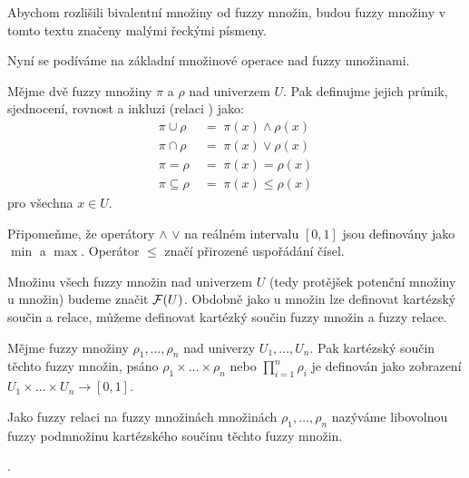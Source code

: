 \documentclass[a4paper,10pt]{article}
\begin{document}
\begin{notation*}
 Abychom rozlišili  bivalentní množiny od fuzzy množin, budou fuzzy množiny v tomto textu značeny malými řeckými písmeny.
\end{notation*}

Nyní se podíváme na základní množinové operace nad fuzzy množinami.
\begin{definition}
 Mějme dvě fuzzy množiny $\pi$ a $\rho$ nad univerzem $U$. Pak definujme jejich průnik, sjednocení, rovnost a inkluzi (relaci ) jako:
 \begin{align*}
  \pi \cup \rho 	\; &= \; \pi(x) \wedge \rho(x) \\
  \pi \cap \rho 	\; &= \; \pi(x) \vee \rho(x) \\
  \pi = \rho 		\; &= \; \pi(x) = \rho(x) \\
  \pi \subseteq \rho 	\; &= \; \pi(x) \le \rho(x) 
 \end{align*}
 pro všechna $x \in U$.
\end{definition}

Připomeňme, že operátory $\wedge$ $\vee$ na reálném intervalu $[0, 1]$ jsou definovány jako $\min$ a $\max$. Operátor $\le$ značí přirozené uspořádání čísel.

Množinu všech fuzzy množin nad univerzem $U$ (tedy protějšek potenční množiny u  množin) budeme značit $\mathcal{F}(U)$. Obdobně jako u  množin lze definovat kartézský součin a relace, můžeme definovat kartézký součin fuzzy množin a fuzzy relace. 

\begin{definition}
 Mějme fuzzy množiny $\rho_1, \dots, \rho_n$ nad univerzy $U_1, \dots, U_n$. Pak kartézský součin těchto fuzzy množin, psáno $\rho_1 \times \dots \times \rho_n$ nebo $\prod_{i=1}^n \rho_i$ je definován jako zobrazení $U_1 \times \dots \times U_n \rightarrow [0, 1]$.
 
\end{definition}
\begin{definition}
 Jako fuzzy relaci na fuzzy množinách množinách $\rho_1, \dots, \rho_n$ nazýváme libovolnou fuzzy podmnožinu kartézského součinu těchto fuzzy množin.
\end{definition}

.

% 
% 
\end{document}
